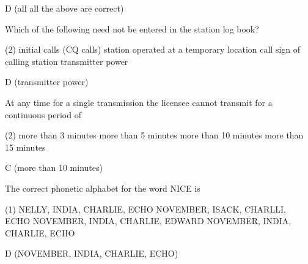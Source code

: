 \documentclass[a4paper]{article}
\begin{document}
\begin{solution}
	D (all all the above are correct)
\end{solution}

\vspace{5mm}



\begin{question}Which of the following need not be entered in the station log book?
	\begin{tasks}(2)
		\task initial calls (CQ calls)
		\task station operated at a temporary location
		\task call sign of calling station
		\task transmitter power
	\end{tasks}
\end{question}

\begin{solution}
	D (transmitter power)
\end{solution}

\vspace{5mm}



\begin{question}At any time for a single transmission the licensee cannot transmit for a continuous period of \spaces
	\begin{tasks}(2)
		\task more than 3 minutes
		\task more than 5 minutes
		\task more than 10 minutes
		\task more than 15 minutes
	\end{tasks}
\end{question}

\begin{solution}
	C (more than 10 minutes)
\end{solution}

\vspace{5mm}



\begin{question}The correct phonetic alphabet for the word \apostrophe{}NICE\apostrophe{} is
	\begin{tasks}(1)
		\task NELLY, INDIA, CHARLIE, ECHO
		\task NOVEMBER, ISACK, CHARLLI, ECHO
		\task NOVEMBER, INDIA, CHARLIE, EDWARD
		\task NOVEMBER, INDIA, CHARLIE, ECHO
	\end{tasks}
\end{question}

\begin{solution}
	D (NOVEMBER, INDIA, CHARLIE, ECHO\textsl{})
\end{solution}

\vspace{5mm}
\end{document}
